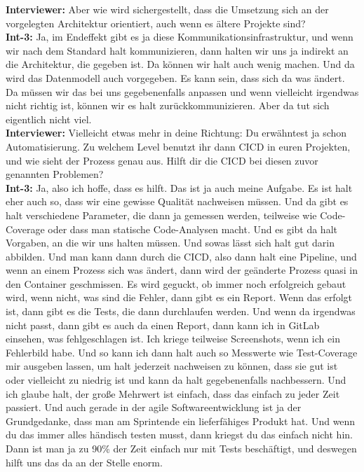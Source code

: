 \textbf{Interviewer:} Aber wie wird sichergestellt, dass die Umsetzung sich an der vorgelegten Architektur orientiert, auch wenn es ältere Projekte sind? \\
\textbf{Int-3:} Ja, im Endeffekt gibt es ja diese Kommunikationsinfrastruktur, und wenn wir nach dem Standard halt kommunizieren, dann halten wir uns ja indirekt an die Architektur, die gegeben ist. Da können wir halt auch wenig machen. Und da wird das Datenmodell auch vorgegeben. Es kann sein, dass sich da was ändert. Da müssen wir das bei uns gegebenenfalls anpassen und wenn vielleicht irgendwas nicht richtig ist, können wir es halt zurückkommunizieren. Aber da tut sich eigentlich nicht viel.\\
\textbf{Interviewer:} Vielleicht etwas mehr in deine Richtung: Du erwähntest ja schon Automatisierung. Zu welchem Level benutzt ihr dann CICD in euren Projekten, und wie sieht der Prozess genau aus. Hilft dir die CICD bei diesen zuvor genannten Problemen? \\
\textbf{Int-3:} Ja, also ich hoffe, dass es hilft. Das ist ja auch meine Aufgabe. Es ist halt eher auch so, dass wir eine gewisse Qualität nachweisen müssen. Und da gibt es halt verschiedene Parameter, die dann ja gemessen werden, teilweise wie Code-Coverage oder dass man statische Code-Analysen macht. Und es gibt da halt Vorgaben, an die wir uns halten müssen. Und sowas lässt sich halt gut darin abbilden. Und man kann dann durch die CICD, also dann halt eine Pipeline, und wenn an einem Prozess sich was ändert, dann wird der geänderte Prozess quasi in den Container geschmissen. Es wird geguckt, ob immer noch erfolgreich gebaut wird, wenn nicht, was sind die Fehler, dann gibt es ein Report. Wenn das erfolgt ist, dann gibt es die Tests, die dann durchlaufen werden. Und wenn da irgendwas nicht passt, dann gibt es auch da einen Report, dann kann ich in GitLab einsehen, was fehlgeschlagen ist. Ich kriege teilweise Screenshots, wenn ich ein Fehlerbild habe. Und so kann ich dann halt auch so Messwerte wie Test-Coverage mir ausgeben lassen, um halt jederzeit nachweisen zu können, dass sie gut ist oder vielleicht zu niedrig ist und kann da halt gegebenenfalls nachbessern. Und ich glaube halt, der große Mehrwert ist einfach, dass das einfach zu jeder Zeit passiert. Und auch gerade in der agile Softwareentwicklung ist ja der Grundgedanke, dass man am Sprintende ein lieferfähiges Produkt hat. Und wenn du das immer alles händisch testen musst, dann kriegst du das einfach nicht hin. Dann ist man ja zu 90\% der Zeit einfach nur mit Tests beschäftigt, und deswegen hilft uns das da an der Stelle enorm.\\
